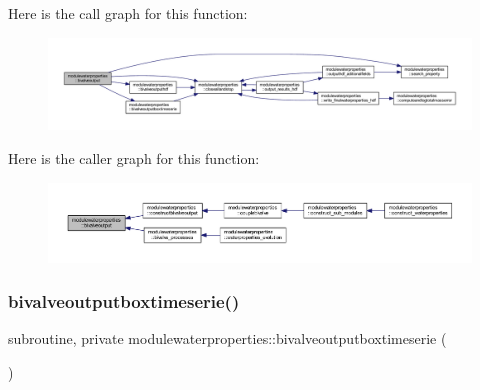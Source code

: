 Here is the call graph for this function\+:\nopagebreak
\begin{figure}[H]
\begin{center}
\leavevmode
\includegraphics[width=350pt]{namespacemodulewaterproperties_a8446703f7cbfef308ed1b6f7114594a2_cgraph}
\end{center}
\end{figure}
Here is the caller graph for this function\+:\nopagebreak
\begin{figure}[H]
\begin{center}
\leavevmode
\includegraphics[width=350pt]{namespacemodulewaterproperties_a8446703f7cbfef308ed1b6f7114594a2_icgraph}
\end{center}
\end{figure}
\mbox{\label{namespacemodulewaterproperties_afcdb7811c7721d558a0d6ec94b87f297}} 
\subsubsection{\texorpdfstring{bivalveoutputboxtimeserie()}{bivalveoutputboxtimeserie()}}
{\footnotesize\ttfamily subroutine, private modulewaterproperties\+::bivalveoutputboxtimeserie (\begin{DoxyParamCaption}{ }\end{DoxyParamCaption})\hspace{0.3cm}{\ttfamily [private]}}

